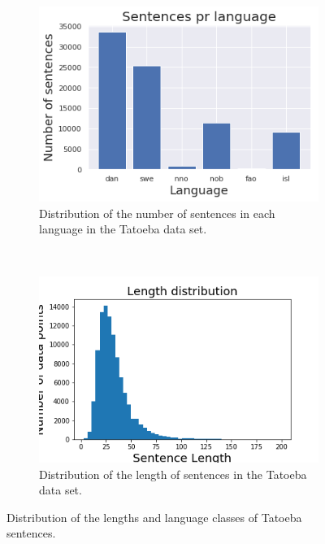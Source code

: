 \begin{figure}
    \centering
    \begin{subfigure}[b]{0.45\textwidth}
      \includegraphics[scale=0.5]{figs/tatoebasentprlang}
      \caption{Distribution of the number of sentences in each language in the Tatoeba data set.}
      \label{tatoebasentprlang}
    \end{subfigure}
    ~
    \begin{subfigure}[b]{0.45\textwidth}
      \includegraphics[scale=0.5]{figs/taboeba-faliurelengthdist}
      \caption{Distribution of the length of sentences in the Tatoeba data set.}
      \label{tatoebalengths}
    \end{subfigure}
    \caption{Distribution of the lengths and language classes of Tatoeba sentences.}
\end{figure}

